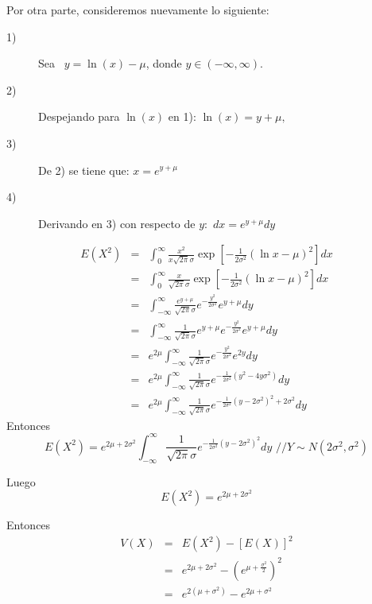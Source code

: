 \begin{i}
Por otra parte, consideremos nuevamente lo siguiente:
\begin{description}
\item[1)] Sea \ $y=\ln (x)-\mu $, donde $y\in (-\infty ,\infty ).$
\item[2)] Despejando para $\ln (x)$ en 1): $\ln (x)=y+\mu ,$
\item[3)] De 2) se tiene que: $x=e^{y+\mu }$
\item[4)] Derivando en 3) con respecto de $y:$ $dx=e^{y+\mu }dy$
\end{description}

\begin{eqnarray*}
E(X^{2}) &=&\int_{0}^{\infty }\frac{x^{2}}{x\sqrt{2\pi }\sigma }\exp \left[ -
\frac{1}{2\sigma ^{2}}\left( \ln x-\mu \right) ^{2}\right] dx \\
&=&\int_{0}^{\infty }\frac{x}{\sqrt{2\pi }\sigma }\exp \left[ -\frac{1}{
2\sigma ^{2}}\left( \ln x-\mu \right) ^{2}\right] dx \\
&=&\int_{-\infty }^{\infty }\frac{e^{y+\mu }}{\sqrt{2\pi }\sigma }e^{-\frac{
y^{2}}{2\sigma ^{2}}}e^{y+\mu }dy \\
&=&\int_{-\infty }^{\infty }\frac{1}{\sqrt{2\pi }\sigma }e^{y+\mu }e^{-\frac{
y^{2}}{2\sigma ^{2}}}e^{y+\mu }dy \\
&=&e^{2\mu }\int_{-\infty }^{\infty }\frac{1}{\sqrt{2\pi }\sigma }e^{-\frac{
y^{2}}{2\sigma ^{2}}}e^{2y}dy \\
&=&e^{2\mu }\int_{-\infty }^{\infty }\frac{1}{\sqrt{2\pi }\sigma }e^{-\frac{1
}{2\sigma ^{2}}(y^{2}-4y\sigma ^{2})}dy \\
&=&e^{2\mu }\int_{-\infty }^{\infty }\frac{1}{\sqrt{2\pi }\sigma }e^{-\frac{1
}{2\sigma ^{2}}(y-2\sigma ^{2})^{2}+2\sigma ^{2}}dy
\end{eqnarray*}%
Entonces%
\begin{equation*}
E(X^{2})=e^{2\mu +2\sigma ^{2}}\int_{-\infty }^{\infty }\frac{1}{\sqrt{2\pi }
\sigma }e^{-\frac{1}{2\sigma ^{2}}(y-2\sigma ^{2})^{2}}dy\text{ \ //}Y\sim
N(2\sigma ^{2},\sigma ^{2})
\end{equation*}

Luego 
\begin{equation*}
E(X^{2})=e^{2\mu +2\sigma ^{2}}
\end{equation*}

Entonces 
\begin{eqnarray*}
V(X) &=&E(X^{2})-\left[ E(X)\right] ^{2} \\
&=&e^{2\mu +2\sigma ^{2}}-\left( e^{\mu +\frac{\sigma ^{2}}{2}}\right) ^{2}
\\
&=&e^{2\left( \mu +\sigma ^{2}\right) }-e^{2\mu +\sigma ^{2}}
\end{eqnarray*}


\end{i}
